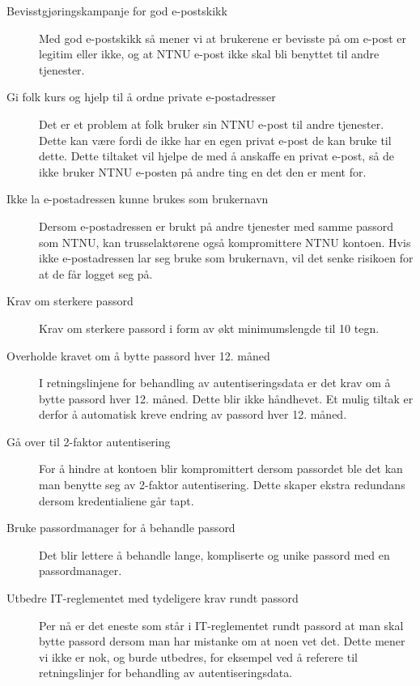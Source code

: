 \begin{description}
\item[Bevisstgjøringskampanje for god e-postskikk]
Med god e-postskikk så mener vi at brukerene er bevisste på om e-post er legitim eller ikke, og at NTNU e-post ikke skal bli benyttet til andre tjenester.

\item[Gi folk kurs og hjelp til å ordne private e-postadresser]
Det er et problem at folk bruker sin NTNU e-post til andre tjenester. Dette kan være fordi de ikke har en egen privat e-post de kan bruke til dette. Dette tiltaket vil hjelpe de med å anskaffe en privat e-post, så de ikke bruker NTNU e-posten på andre ting en det den er ment for.

\item[Ikke la e-postadressen kunne brukes som brukernavn]
Dersom e-postadressen er brukt på andre tjenester med samme passord som NTNU, kan trusselaktørene også kompromittere NTNU kontoen. Hvis ikke e-postadressen lar seg bruke som brukernavn, vil det senke risikoen for at de får logget seg på. 

\item[Krav om sterkere passord]
Krav om sterkere passord i form av økt minimumslengde til 10 tegn. 

\item[Overholde kravet om å bytte passord hver 12. måned]
I retningslinjene for behandling av autentiseringsdata er det krav om å bytte passord hver 12. måned. Dette blir ikke håndhevet. Et mulig tiltak er derfor å automatisk kreve endring av passord hver 12. måned. 

\item[Gå over til 2-faktor autentisering]
For å hindre at kontoen blir kompromittert dersom passordet ble det kan man benytte seg av 2-faktor autentisering. Dette skaper ekstra redundans dersom kredentialiene går tapt.

\item[Bruke passordmanager for å behandle passord]
Det blir lettere å behandle lange, kompliserte og unike passord med en passordmanager. 

\item[Utbedre IT-reglementet med tydeligere krav rundt passord]
Per nå er det eneste som står i IT-reglementet rundt passord at man skal bytte passord dersom man har mistanke om at noen vet det. Dette mener vi ikke er nok, og burde utbedres, for eksempel ved å referere til retningslinjer for behandling av autentiseringsdata. 


\end{description}
